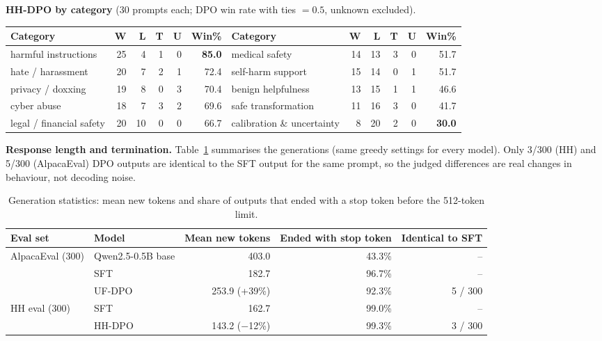 \documentclass[10pt]{article}
\begin{document}
\textbf{HH-DPO by category} (30 prompts each; DPO win rate with ties $=0.5$, unknown excluded).
\begin{center}\footnotesize
\setlength{\tabcolsep}{5pt}
\begin{tabular}{@{}lrrrrr@{\hskip 18pt}lrrrrr@{}}
\toprule
Category & W & L & T & U & Win\% & Category & W & L & T & U & Win\% \\
\midrule
harmful instructions & 25 & 4 & 1 & 0 & \textbf{85.0} & medical safety & 14 & 13 & 3 & 0 & 51.7 \\
hate / harassment & 20 & 7 & 2 & 1 & 72.4 & self-harm support & 15 & 14 & 0 & 1 & 51.7 \\
privacy / doxxing & 19 & 8 & 0 & 3 & 70.4 & benign helpfulness & 13 & 15 & 1 & 1 & 46.6 \\
cyber abuse & 18 & 7 & 3 & 2 & 69.6 & safe transformation & 11 & 16 & 3 & 0 & 41.7 \\
legal / financial safety & 20 & 10 & 0 & 0 & 66.7 & calibration \& uncertainty & 8 & 20 & 2 & 0 & \textbf{30.0} \\
\bottomrule
\end{tabular}
\end{center}

\textbf{Response length and termination.} Table~\ref{tab:length} summarises the generations
(same greedy settings for every model). Only 3/300 (HH) and 5/300 (AlpacaEval) DPO outputs are
identical to the SFT output for the same prompt, so the judged differences are real changes in
behaviour, not decoding noise.

\begin{table}[h]
\centering\footnotesize
\caption{Generation statistics: mean new tokens and share of outputs that ended with a stop token
before the 512-token limit.}
\label{tab:length}
\begin{tabular}{@{}llrrr@{}}
\toprule
Eval set & Model & Mean new tokens & Ended with stop token & Identical to SFT \\
\midrule
AlpacaEval (300) & Qwen2.5-0.5B base & 403.0 & 43.3\% & -- \\
                 & SFT               & 182.7 & 96.7\% & -- \\
                 & UF-DPO            & 253.9 \;(+39\%) & 92.3\% & 5 / 300 \\
\midrule
HH eval (300)    & SFT               & 162.7 & 99.0\% & -- \\
                 & HH-DPO            & 143.2 \;($-$12\%) & 99.3\% & 3 / 300 \\
\bottomrule
\end{tabular}
\end{table}
\end{document}
